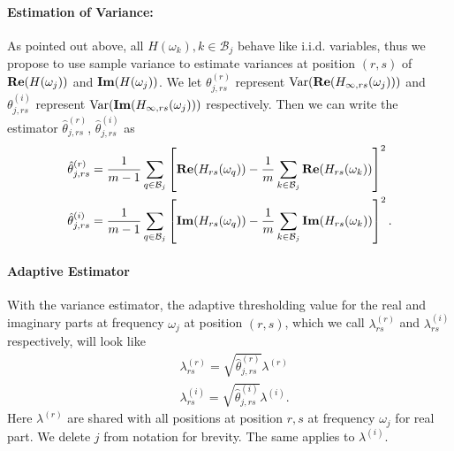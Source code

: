 \paragraph{Estimation of Variance:}
As pointed out above, all $H(\omega_k), k\in \mathcal{B}_j$ behave like i.i.d. variables, thus we propose to use sample variance to estimate variances at position $(r, s)$ of ${\bf Re}(H(\omega_j))$ and 
${\bf Im}(H(\omega_j))$. We let $\theta^{(r)}_{j, rs}$ represent  $\mathrm{Var}({\bf Re}(H_{\infty, rs}(\omega_j)))$ and $\theta^{(i)}_{j, rs}$ represent $\mathrm{Var}({\bf Im}(H_{\infty, rs}(\omega_j)))$ respectively.  Then we can write the estimator $\hat{\theta}^{(r)}_{j,rs}$,  $\hat{\theta}^{(i)}_{j,rs} $ as 
\begin{equation}
\label{eq:variance_estimator}
\begin{aligned}
& \hat{\theta}^{(r)}_{j,rs} = \frac{1}{m-1}\sum_{q\in \mathcal{B}_j} \left[{\bf Re}(H_{rs}(\omega_q)) - \frac{1}{m}\sum_{k\in \mathcal{B}_j} {\bf Re}(H_{rs}(\omega_k))\right]^2 \\
&\hat{\theta}^{(i)}_{j,rs} = \frac{1}{m-1}\sum_{q\in \mathcal{B}_j} \left[{\bf Im}(H_{rs}(\omega_q)) - \frac{1}{m}\sum_{k\in \mathcal{B}_j} {\bf Im}(H_{rs}(\omega_k))\right]^2. 
\end{aligned}
\end{equation}

\paragraph{Adaptive Estimator}
With the variance estimator,  the adaptive thresholding value for the real and imaginary parts at frequency $\omega_j$ at position $(r, s)$, which we call $\lambda^{(r)}_{rs}$ and $\lambda^{(i)}_{rs}$ respectively, will look like
\begin{equation}
\begin{aligned}
& \lambda^{(r)}_{rs} = \sqrt{\hat{\theta}^{(r)}_{j, rs}} \lambda^{(r)} \\
& \lambda^{(i)}_{rs}= \sqrt{\hat{\theta}^{(i)}_{j, rs}} \lambda^{(i)}.
\end{aligned}
\end{equation}
Here $\lambda^{(r)}$ are shared with all positions at position $r,s$ at frequency $\omega_j$ for real part. We delete $j$ from notation for brevity. The same applies to $\lambda^{(i)}$. 


